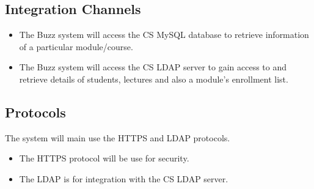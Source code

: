 \subsection{Integration Channels}
\begin{itemize}
\item The Buzz system will access the CS MySQL database to retrieve information of a particular module/course.
\item The Buzz system will access the CS LDAP server to gain access to and retrieve details of students,  lectures and also a module's enrollment  list.
\end{itemize}

\subsection{Protocols}
The system will main use the HTTPS and LDAP protocols.
\begin{itemize}
\item The HTTPS protocol will be use for security.
\item The LDAP is for integration with the CS LDAP server.  
\end{itemize}